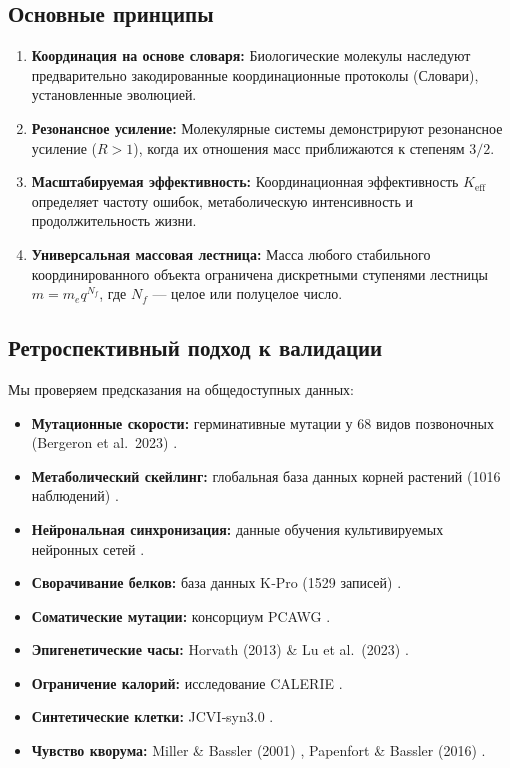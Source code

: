 \documentclass[11pt,a4paper]{article}
\begin{document}
	\subsection{Основные принципы}
	
	\begin{enumerate}
		\item \textbf{Координация на основе словаря:} Биологические молекулы наследуют предварительно закодированные координационные протоколы (Словари), установленные эволюцией.
		\item \textbf{Резонансное усиление:} Молекулярные системы демонстрируют резонансное усиление (\(R > 1\)), когда их отношения масс приближаются к степеням \(3/2\).
		\item \textbf{Масштабируемая эффективность:} Координационная эффективность \(K_{\mathrm{eff}}\) определяет частоту ошибок, метаболическую интенсивность и продолжительность жизни.
		\item \textbf{Универсальная массовая лестница:} Масса любого стабильного координированного объекта ограничена дискретными ступенями лестницы \(m = m_e q^{N_f}\), где \(N_f\) — целое или полуцелое число.
	\end{enumerate}
	
	\subsection{Ретроспективный подход к валидации}
	
	Мы проверяем предсказания на общедоступных данных:
	\begin{itemize}
		\item \textbf{Мутационные скорости:} герминативные мутации у 68 видов позвоночных (Bergeron et al.\ 2023) \cite{Bergeron2023a}.
		\item \textbf{Метаболический скейлинг:} глобальная база данных корней растений (1016 наблюдений) \cite{Yuan2020}.
		\item \textbf{Нейрональная синхронизация:} данные обучения культивируемых нейронных сетей \cite{PLOS2025b}.
		\item \textbf{Сворачивание белков:} база данных K‑Pro (1529 записей) \cite{Turina2023}.
		\item \textbf{Соматические мутации:} консорциум PCAWG \cite{PCAWG2020}.
		\item \textbf{Эпигенетические часы:} Horvath (2013) \& Lu et al.\ (2023) \cite{Horvath2013, Lu2023}.
		\item \textbf{Ограничение калорий:} исследование CALERIE \cite{CALERIE2018, CALERIE2024}.
		\item \textbf{Синтетические клетки:} JCVI‑syn3.0 \cite{Hutchison2016, Pelletier2023}.
		\item \textbf{Чувство кворума:} Miller \& Bassler (2001) \cite{Miller2001}, Papenfort \& Bassler (2016) \cite{Papenfort2016}.
	\end{itemize}
	
\end{document}
